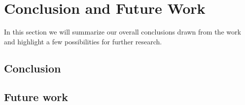 
\chapter{Conclusion and Future Work}\label{ch:conclusion}
In this section we will summarize our overall conclusions drawn from the work and highlight a few possibilities for further research.
\section{Conclusion}

  
\section{Future work}




